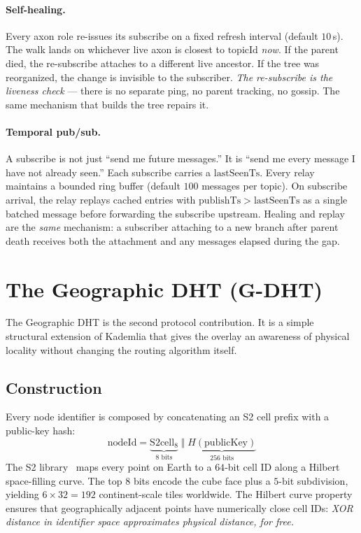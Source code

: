 \documentclass[conference]{IEEEtran}
\newcommand{\GDHT}{G-DHT\xspace}
\begin{document}
\paragraph{Self-healing.}
Every axon role re-issues its subscribe on a fixed refresh
interval (default $10$\,s).  The walk lands on whichever live
axon is closest to $\mathrm{topicId}$ \emph{now}.  If the
parent died, the re-subscribe attaches to a different live
ancestor.  If the tree was reorganized, the change is invisible
to the subscriber.  \emph{The re-subscribe is the liveness
check} --- there is no separate ping, no parent tracking, no
gossip.  The same mechanism that builds the tree repairs it.

\paragraph{Temporal pub/sub.}
A subscribe is not just ``send me future messages.''  It is
``send me every message I have not already seen.''  Each
subscribe carries a $\mathrm{lastSeenTs}$.  Every relay
maintains a bounded ring buffer (default $100$ messages per
topic).  On subscribe arrival, the relay replays cached entries
with $\mathrm{publishTs} > \mathrm{lastSeenTs}$ as a single
batched message before forwarding the subscribe upstream.
Healing and replay are the \emph{same} mechanism: a subscriber
attaching to a new branch after parent death receives both the
attachment and any messages elapsed during the gap.

\section{The Geographic DHT (\GDHT)}
\label{sec:gdht}

The Geographic DHT is the second protocol contribution.  It is
a simple structural extension of Kademlia that gives the
overlay an awareness of physical locality without changing the
routing algorithm itself.

\subsection{Construction}
Every node identifier is composed by concatenating an S2 cell
prefix with a public-key hash:
\begin{equation}
\mathrm{nodeId} =
\underbrace{\mathrm{S2cell}_{8}}_{\text{8 bits}}
\;\Vert\;
\underbrace{H(\mathrm{publicKey})}_{\text{256 bits}}
\label{eq:gdht-id}
\end{equation}
The S2 library~\cite{s2geometry} maps every point on Earth to a
$64$-bit cell ID along a Hilbert space-filling curve.  The top
$8$ bits encode the cube face plus a $5$-bit subdivision,
yielding $6 \times 32 = 192$ continent-scale tiles worldwide.
The Hilbert curve property ensures that geographically adjacent
points have numerically close cell IDs: \emph{XOR distance in
identifier space approximates physical distance, for free.}
\end{document}
